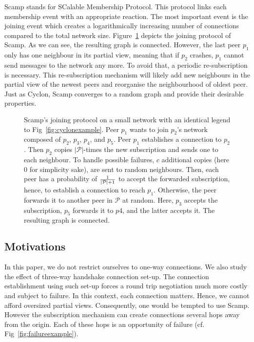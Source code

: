 \begin{asparadesc}
\item [Scamp]\cite{ganesh2001scamp,ganesh2003peer} stands for SCalable
  Membership Protocol. This protocol links each membership event with an
  appropriate reaction.  The most important event is the joining event which
  creates a logarithmically increasing number of connections compared to the
  total network size.  Figure~\ref{fig:scampexample} depicts the joining
  protocol of Scamp. As we can see, the resulting graph is connected. However,
  the last peer $p_1$ only has one neighbour in its partial view, meaning that
  if $p_2$ crashes, $p_1$ cannot send messages to the network any more. To
  avoid that, a periodic re-subscription is necessary. This re-subscription
  mechanism will likely add new neighbours in the partial view of the newest
  peers and reorganise the neighbourhood of oldest peer. Just as Cyclon, Scamp
  converges to a random graph and provide their desirable properties.
\end{asparadesc}

\begin{figure}
  \centering
  
  \caption{\label{fig:scampexample} Scamp's joining protocol on a small network
    with an identical legend to Fig~\ref{fig:cyclonexample}. Peer $p_1$ wants
    to join $p_2$'s network composed of $p_2$, $p_3$, $p_4$, and $p_5$. Peer
    $p_1$ establishes a connection to $p_2$. Then $p_2$ copies
    $|\mathcal{P}|$-times the new subscription and sends one to each
    neighbour. To handle possible failures, $c$ additional copies (here $0$ for
    simplicity sake), are sent to random neighbours. Then, each peer has a
    probability of $1\over{|\mathcal{P}|+1}$ to accept the forwarded
    subscription, hence, to establish a connection to reach $p_1$. Otherwise,
    the peer forwards it to another peer in $\mathcal{P}$ at random. Here,
    $p_3$ accepts the subscription, $p_5$ forwards it to $p4$, and the latter
    accepts it. The resulting graph is connected.}
\end{figure}

\subsection{Motivations}
In this paper, we do not restrict ourselves to one-way connections. We also
study the effect of three-way handshake connection set-up. The connection
establishment using such set-up forces a round trip negotiation much more
costly and subject to failure. In this context, each connection matters. Hence,
we cannot afford oversized partial views. Consequently, one would be tempted to
use Scamp. However the subscription mechanism can create connections several
hops away from the origin. Each of these hops is an opportunity of failure
(cf. Fig~\ref{fig:failureexample}).

